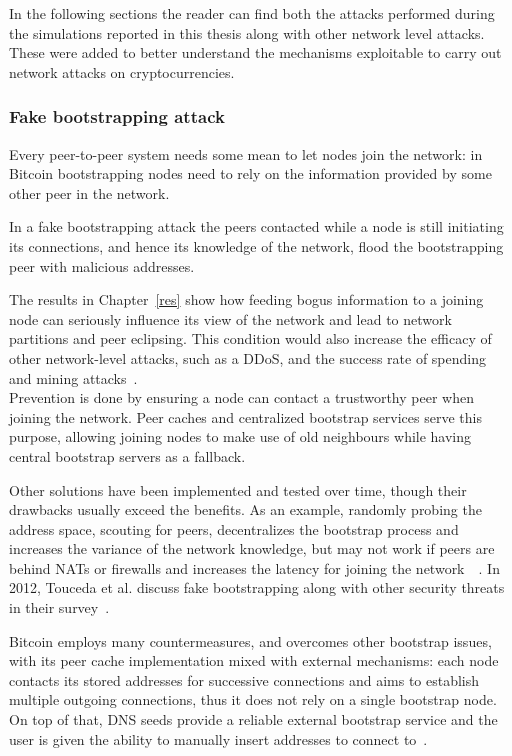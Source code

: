 \documentclass[12pt, letterpaper, twoside]{article}
\begin{document}
In the following sections the reader can find both the attacks performed during the simulations reported in this thesis along with other network level attacks. These were added to better understand the mechanisms exploitable to carry out network attacks on cryptocurrencies.

\subsubsection{Fake bootstrapping attack}\label{fakeboot}
Every peer-to-peer system needs some mean to let nodes join the network: in Bitcoin bootstrapping nodes need to rely on the information provided by some other peer in the network.

In a fake bootstrapping attack the peers contacted while a node is still initiating its connections, and hence its knowledge of the network, flood the bootstrapping peer with malicious addresses.

The results in Chapter~\ref{res} show how feeding bogus information to a joining node can seriously influence its view of the network and lead to network partitions and peer eclipsing. This condition would also increase the efficacy of other network-level attacks, such as a DDoS, and the success rate of spending and mining attacks~\cite{eclipseatk}.\\

Prevention is done by ensuring a node can contact a trustworthy peer when joining the network. Peer caches and centralized bootstrap services serve this purpose, allowing joining nodes to make use of old neighbours while having central bootstrap servers as a fallback.

Other solutions have been implemented and tested over time, though their drawbacks usually exceed the benefits. As an example, randomly probing the address space, scouting for peers, decentralizes the bootstrap process and increases the variance of the network knowledge, but may not work if peers are behind NATs or firewalls and increases the latency for joining the network~\cite{decentrbootstrapp2p}~\cite{localityaware}. In 2012,  Touceda et al. discuss fake bootstrapping along with other security threats in their survey~\cite{toucedafakeboot}.

Bitcoin employs many countermeasures, and overcomes other bootstrap issues, with its peer cache implementation mixed with external mechanisms: each node contacts its stored addresses for successive connections and aims to establish multiple outgoing connections, thus it does not rely on a single bootstrap node. On top of that, DNS seeds provide a reliable external bootstrap service and the user is given the ability to manually insert addresses to connect to~\cite{mahmoud_netsec_boot}.
\end{document}
